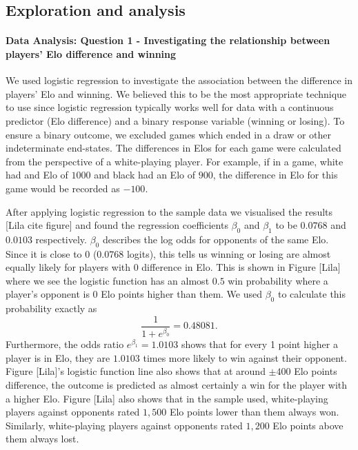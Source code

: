 \documentclass[10pt,a4paper]{article}
\begin{document}
\begin{multicols}{2}
\section{Exploration and  analysis}



\paragraph{Data Analysis: Question 1 - Investigating the relationship between players' Elo difference and winning}

We used logistic regression to investigate the association between the difference in players' Elo and winning. We believed this to be the most appropriate technique to use since logistic regression typically works well for data with a continuous predictor (Elo difference) and a binary response variable (winning or losing). To ensure a binary outcome, we excluded games which ended in a draw or other indeterminate end-states. The differences in Elos for each game were calculated from the perspective of a white-playing player. For example, if in a game, white had and Elo of $1000$ and black had an Elo of $900$, the difference in Elo for this game would be recorded as $-100$.

After applying logistic regression to the sample data we visualised the results [Lila cite figure] and found the regression coefficients $\beta_{0}$ and $\beta_{1}$ to be $0.0768$ and $0.0103$ respectively. $\beta_{0}$ describes the log odds for opponents of the same Elo. Since it is close to $0$ ($0.0768$ logits), this tells us winning or losing are almost equally likely for players with $0$ difference in Elo. This is shown in Figure [Lila] where we see the logistic function has an almost $0.5$ win probability where a player's opponent is $0$ Elo points higher than them. We used $\beta_{0}$ to calculate this probability exactly as 
$$\displaystyle\frac{1}{1+e^{\beta_{0}}} = 0.48081.$$
Furthermore, the odds ratio $e^{\beta_{1}} = 1.0103$ shows that for every 1 point higher a player is in Elo, they are $1.0103$ times more likely to win against their opponent. Figure [Lila]'s logistic function line also shows that at around $\pm 400$ Elo points difference, the outcome is predicted as almost certainly a win for the player with a higher Elo. Figure [Lila] also shows that in the sample used, white-playing players against opponents rated $1,500$ Elo points lower than them always won. Similarly, white-playing players against opponents rated $1,200$ Elo points above them always lost. \newline


\end{multicols}
\end{document}
